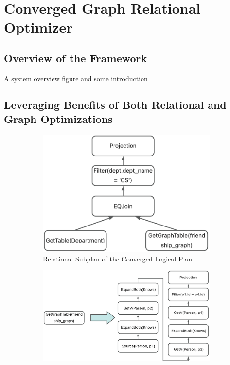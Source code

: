 \section{Converged Graph Relational Optimizer}

\subsection{Overview of the Framework}

A system overview figure and some introduction

\subsection{Leveraging Benefits of Both Relational and Graph Optimizations}

\begin{figure}
    \centering
    \begin{subfigure}[b]{0.4\linewidth}
        \centering
        \includegraphics[width=\linewidth]{./figures/converged-logical-plan-relational.png}
        \caption{Relational Subplan of the Converged Logical Plan.}
        \label{fig:converged-logical-plan-relational}
    \end{subfigure}
    \begin{subfigure}[b]{0.4\linewidth}
        \centering
        \includegraphics[width=\linewidth]{./figures/converged-logical-plan-graph.png}

\end{subfigure}
\end{figure}
